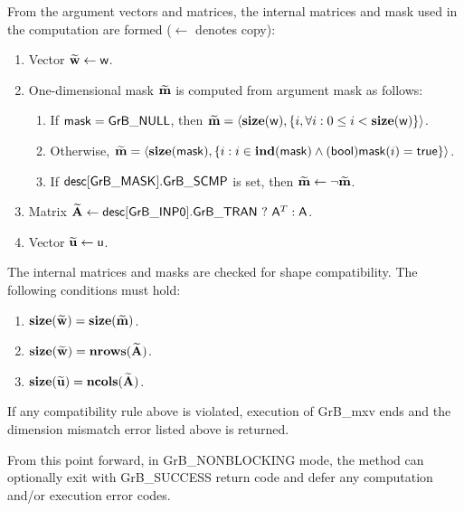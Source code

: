 From the argument vectors and matrices, the internal matrices and mask used in 
the computation are formed ($\leftarrow$ denotes copy):
\begin{enumerate}
	\item Vector ${\bf \widetilde{w}} \leftarrow {\sf w}$.

	\item One-dimensional mask ${\bf \widetilde{m}}$ is computed from 
    argument {\sf mask} as follows:
	\begin{enumerate}
		\item	If ${\sf mask} = {\sf GrB\_NULL}$, then ${\bf \widetilde{m}} = 
        \langle \bold{size}({\sf w}), \{i, \forall i : 0 \leq i < 
        \bold{size}({\sf w}) \} \rangle$.

		\item	Otherwise, ${\bf \widetilde{m}} = 
        \langle \bold{size}({\sf mask}), \{i :  i \in \bold{ind}({\sf mask}) \wedge
        ({\sf bool}){\sf mask}(i) = {\sf true} \} \rangle$.

		\item	If ${\sf desc[GrB\_MASK].GrB\_SCMP}$ is set, then 
        ${\bf \widetilde{m}} \leftarrow \neg {\bf \widetilde{m}}$.
	\end{enumerate}

	\item Matrix ${\bf \widetilde{A}} \leftarrow {\sf desc[GrB\_INP0].GrB\_TRAN} \ ? \ {\sf A}^T : {\sf A}$.

	\item Vector ${\bf \widetilde{u}} \leftarrow {\sf u}$.
\end{enumerate}

The internal matrices and masks are checked for shape compatibility. The following 
conditions must hold:
\begin{enumerate}
	\item $\bold{size}({\bf \widetilde{w}}) = \bold{size}({\bf \widetilde{m}})$.

	\item $\bold{size}({\bf \widetilde{w}}) = \bold{nrows}({\bf \widetilde{A}})$.

	\item $\bold{size}({\bf \widetilde{u}}) = \bold{ncols}({\bf \widetilde{A}})$.
\end{enumerate}
If any compatibility rule above is violated, execution of {\sf GrB\_mxv} ends and 
the dimension mismatch error listed above is returned.

From this point forward, in {\sf GrB\_NONBLOCKING} mode, the method can 
optionally exit with {\sf GrB\_SUCCESS} return code and defer any computation 
and/or execution error codes.

